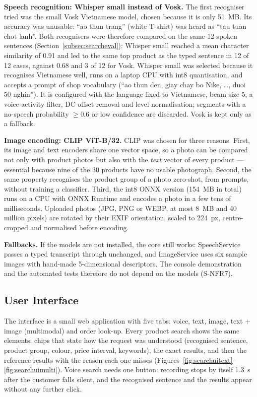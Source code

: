 \textbf{Speech recognition: Whisper small instead of Vosk.} The first recogniser tried was the small Vosk Vietnamese model, chosen because it is only 51~MB. Its accuracy was unusable: ``ao thun trang'' (white T-shirt) was heard as ``tau tuan chot lanh''. Both recognisers were therefore compared on the same 12 spoken sentences (Section~\ref{subsec:searcheval}): Whisper small reached a mean character similarity of 0.91 and led to the same top product as the typed sentence in 12 of 12 cases, against 0.68 and 3 of 12 for Vosk. Whisper small was selected because it recognises Vietnamese well, runs on a laptop CPU with int8 quantisation, and accepts a prompt of shop vocabulary (``ao thun den, giay chay bo Nike, \ldots, duoi 50 nghin''). It is configured with the language fixed to Vietnamese, beam size 5, a voice-activity filter, DC-offset removal and level normalisation; segments with a no-speech probability $\ge 0.6$ or low confidence are discarded. Vosk is kept only as a fallback.

\textbf{Image encoding: CLIP ViT-B/32.} CLIP was chosen for three reasons. First, its image and text encoders share one vector space, so a photo can be compared not only with product photos but also with the \emph{text} vector of every product --- essential because nine of the 30 products have no usable photograph. Second, the same property recognises the product group of a photo zero-shot, from prompts, without training a classifier. Third, the int8 ONNX version (154~MB in total) runs on a CPU with ONNX Runtime and encodes a photo in a few tens of milliseconds. Uploaded photos (JPG, PNG or WEBP, at most 8~MB and 40 million pixels) are rotated by their EXIF orientation, scaled to 224~px, centre-cropped and normalised before encoding.

\textbf{Fallbacks.} If the models are not installed, the core still works: SpeechService passes a typed transcript through unchanged, and ImageService uses six sample images with hand-made 5-dimensional descriptors. The console demonstration and the automated tests therefore do not depend on the models (S-NFR7).

\subsection{User Interface}
The interface is a small web application with five tabs: voice, text, image, text + image (multimodal) and order look-up. Every product search shows the same elements: chips that state how the request was understood (recognised sentence, product group, colour, price interval, keywords), the exact results, and then the reference results with the reason each one misses (Figures~\ref{fig:searchuitext}--\ref{fig:searchuimulti}). Voice search needs one button: recording stops by itself 1.3~s after the customer falls silent, and the recognised sentence and the results appear without any further click.

